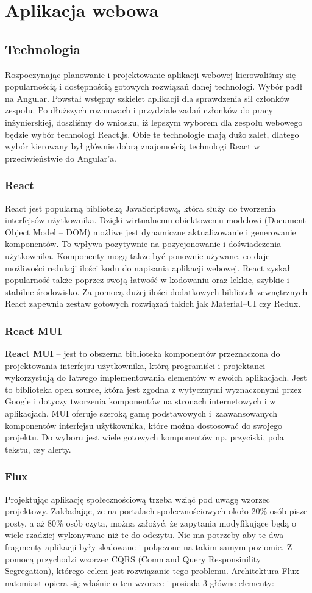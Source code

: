\documentclass[a4paper,twoside,12pt]{book}
\begin{document}
\chapter{Aplikacja webowa}
\section{Technologia}
Rozpoczynając planowanie i projektowanie aplikacji webowej kierowaliśmy się popularnością i dostępnością gotowych rozwiązań danej technologi. Wybór padł na Angular. Powstał wstępny szkielet aplikacji dla sprawdzenia sił członków zespołu. Po dłuższych rozmowach i przydziale zadań członków do pracy inżynierskiej, doszliśmy do wniosku, iż lepszym wyborem dla zespołu webowego będzie wybór technologi React.js. Obie te technologie mają dużo zalet, dlatego wybór kierowany był głównie dobrą znajomością technologi React w przeciwieństwie do Angular'a.  
\subsection{React}
React jest popularną biblioteką JavaScriptową, która służy do tworzenia interfejsów użytkownika. Dzięki wirtualnemu obiektowemu modelowi (Document Object Model -- DOM) możliwe jest dynamiczne aktualizowanie i generowanie komponentów. To wpływa pozytywnie na pozycjonowanie i doświadczenia użytkownika. Komponenty mogą także być ponownie używane, co daje możliwości redukcji ilości kodu do napisania aplikacji webowej. React zyskał popularność także poprzez swoją łatwość w kodowaniu oraz lekkie, szybkie i stabilne środowisko. Za pomocą dużej ilości dodatkowych bibliotek zewnętrznych React zapewnia zestaw gotowych rozwiązań takich jak Material--UI czy Redux.
\subsection{React MUI}
\textbf{React MUI} -- jest to obszerna biblioteka komponentów przeznaczona do projektowania interfejsu użytkownika, którą programiści i projektanci wykorzystują do łatwego implementowania elementów w swoich aplikacjach. Jest to biblioteka open source, która jest zgodna z wytycznymi wyznaczonymi przez Google i dotyczy tworzenia komponentów na stronach internetowych i w aplikacjach. MUI oferuje szeroką gamę podstawowych i~zaawansowanych komponentów interfejsu użytkownika, które można dostosować do swojego projektu. Do wyboru jest wiele gotowych komponentów np. przyciski, pola tekstu, czy alerty.
\subsection{Flux}
Projektując aplikację społecznościową trzeba wziąć pod uwagę wzorzec projektowy. Zakładając, że na portalach społecznościowych około 20\% osób pisze posty, a aż 80\% osób czyta, można założyć, że zapytania modyfikujące będą o wiele rzadziej wykonywane niż te do odczytu. Nie ma potrzeby aby te dwa fragmenty aplikacji były skalowane i połączone na takim samym poziomie. Z pomocą przychodzi wzorzec CQRS (Command Query Responsinility Segregation), którego celem jest rozwiązanie tego problemu. Architektura Flux natomiast opiera się właśnie o ten wzorzec i posiada 3 główne elementy:
\end{document}
